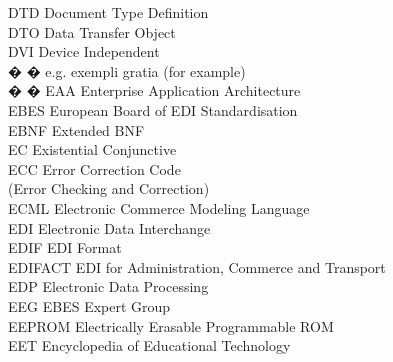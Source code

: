 \begin{tabbing}
    \>DTD \>\>Document Type Definition\\


    \>DTO \>\>Data Transfer Object\\

    \>DVI \>\>Device Independent\\


� � \>e.g. \>\>exempli gratia (for example)\\

� � \>EAA \>\>Enterprise Application Architecture\\


    \>EBES \>\>European Board of EDI Standardisation\\

    \>EBNF \>\>Extended BNF\\

    \>EC \>\>Existential Conjunctive\\

    \>ECC \>\>Error Correction Code\\
        \>\>\>(Error Checking and Correction)\\

    \>ECML \>\>Electronic Commerce Modeling Language\\


    \>EDI \>\>Electronic Data Interchange\\

    \>EDIF \>\>EDI Format\\

    \>EDIFACT \>\>EDI for Administration, Commerce and Transport\\

    \>EDP \>\>Electronic Data Processing\\

    \>EEG \>\>EBES Expert Group\\

    \>EEPROM \>\>Electrically Erasable Programmable ROM\\

    \>EET \>\>Encyclopedia of Educational Technology\\


\end{tabbing}
